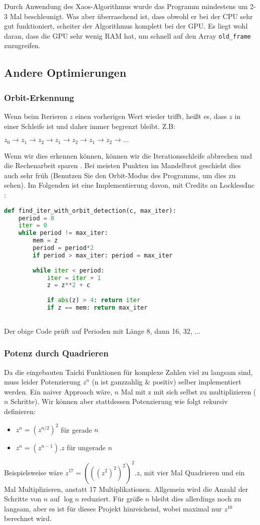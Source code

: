 \documentclass{article}
\begin{document}
Durch Anwendung des Xaos-Algorithmus wurde das Programm mindestens um 2-3 Mal beschleunigt. Was aber überraschend ist, dass obwohl er bei der CPU sehr gut funktioniert, scheiter der Algorithmus komplett bei der GPU. Es liegt wohl daran, dass die GPU sehr wenig RAM hat, um schnell auf den Array \lstinline|old_frame| zuzugreifen. 
\subsection{Andere Optimierungen}
\subsubsection{Orbit-Erkennung}
Wenn beim Iterieren $z$ einen vorherigen Wert wieder trifft, heißt es, dass $z$ in einer Schleife ist und daher immer begrenzt bleibt. Z.B: 
 
$z_0 \rightarrow z_1 \rightarrow z_2 \rightarrow z_1 \rightarrow z_2 \rightarrow z_1 \rightarrow z_2 \rightarrow ...$
 
 
Wenn wir dies erkennen können, können wir die Iterationsschleife abbrechen und die Rechenarbeit sparen . Bei meisten Punkten im Mandelbrot geschieht dies auch sehr früh (Benutzen Sie den Orbit-Modus des Programms, um dies zu sehen). Im Folgenden ist eine Implementierung davon, mit Credits an LocklessInc \cite{lockless}:
\begin{lstlisting}[language=python]
def find_iter_with_orbit_detection(c, max_iter):
	period = 8
	iter = 0
	while period != max_iter:
		mem = z
		period = period*2
		if period > max_iter: period = max_iter
		
		while iter < period:
			iter = iter + 1
			z = z**2 + c 
			
			if abs(z) > 4: return iter 
			if z == mem: return max_iter
				
\end{lstlisting}
Der obige Code prüft auf Perioden mit Länge 8, dann 16, 32, ...

\subsubsection{Potenz durch Quadrieren}
Da die eingebauten Taichi Funktionen für komplexe Zahlen viel zu langsam sind, muss leider Potenzierung $z^n$ (n ist ganzzahlig \& positiv) selber implementiert werden. Ein naiver Approach wäre, $n$ Mal mit z mit sich selbst zu multiplizieren ($n$ Schritte). Wir können aber stattdessen Potenzierung wie folgt rekursiv definieren: 
\begin{itemize}
\item $z^n = (z^{n/2})^2$ für gerade $n$ 
\item $z^n = (z^{n-1}).z$ für ungerade $n$
\end{itemize}
Beispielsweise wäre $z^{17} = (((z^2)^2)^2)^2 . z$, mit vier Mal Quadrieren und ein Mal Multiplizieren, anstatt 17 Multiplikationen. Allgemein wird die Anzahl der Schritte von $n$ auf $\log n$ reduziert. Für größe $n$ bleibt dies allerdings noch zu langsam, aber es ist für dieses Projekt hinreichend, wobei maximal nur $z^{10}$ berechnet wird.
\end{document}
